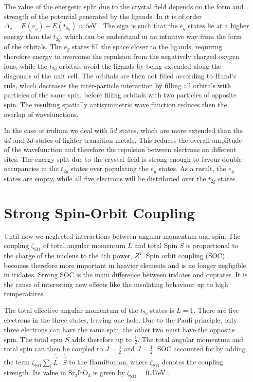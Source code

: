 The value of the energetic split due to the crystal field depends on the form and strength of the potential generated by the ligands. 
In \Sriro it is of order $\Delta_c  = E(e_g) - E(t_{2g})\approx 5$eV \cite{PhysRevB.80.075112}. 
The sign is such that the $e_g$ states lie at a  higher energy than the $t_{2g}$,
which can be understand in an intuitive way from the form of the orbitals.
The $e_g$ states fill the space closer to the ligands, requiring therefore 
energy to overcome the repulsion from the negatively charged oxygen ions,
while the $t_{2g}$ orbitals avoid the ligands by being extended along the diagonals of the unit cell. 
The orbitals are then not filled according to Hund's rule,
which decreases the inter-particle interaction by filling all orbitals with particles of the same spin,
before filling orbitals with two particles of opposite spin. 
The resulting spatially antisymmetric wave function reduces then the overlap of wavefunctions.

In the case of iridium we deal with  $5d$ states, which are more extended than the $4d$ and $3d$ states of lighter transition metals. 
This reduces the overall amplitude of the wavefunction and therefore  the repulsion between electrons on different sites. 
The energy split due to the crystal field is strong enough to favour double occupancies in the $t_{2g}$ states over populating the $e_g$ states. 
As a result, the $e_g$ states are empty, while all five electrons will be distributed over the $t_{2g}$ states. 





\section{Strong Spin-Orbit Coupling}


Until now we neglected interactions between angular momentum and spin. 
The coupling $\zeta_{\mathrm{SO}}$ of total angular momentum $L$ and total Spin $S$ is proportional to the charge of the nucleus to the 4th power, $Z^4$.
Spin orbit coupling (SOC) becomes therefore more important in heavier elements and is no longer negligible in iridates.
Strong SOC is the main difference between iridates and cuprates.
It is the cause of interesting new effects like the insulating behaviour up to high temperatures. 

The total effective angular momentum of the $t_{2g}$-states is $L=1$. 
There are five electrons in the three states, leaving one hole.
Due to the Pauli principle, only three electrons can have the same spin, 
the other two must have the opposite spin. 
The total spin $S$ adds therefore up to $\frac12$.
The total angular momentum and total spin can then be coupled to
$J=\frac32$ and $J=\frac12$.
%
SOC accounted for by adding the term $\zeta_{\mathrm{SO}} \sum_{i} \hat{\vec L} \cdot \hat{\vec S}$ to the Hamiltonian,
where $\zeta_{\mathrm{SO}}$ denotes the coupling strength. 
Its value in Sr$_2$IrO$_4$ is given by $\zeta_{\mathrm{SO}} = 0.37$eV \cite{PhysRevLett.105.216410}.

